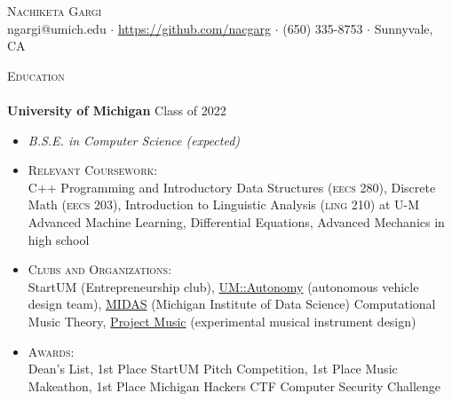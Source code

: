 \documentclass[11pt]{extarticle}
\newcommand{\lineunder} {
	\vspace*{-8pt} \\
	\hspace*{-18pt} \hrulefill \\
}
\newcommand{\header} [1] {
	{\hspace*{-18pt}\vspace*{6pt} \textsc{#1}}
	\vspace*{-6pt} \lineunder
}
\begin{document}
\vspace*{-30pt}
	

\begin{center}
	{\Huge \scshape {Nachiketa Gargi}}\\
	ngargi@umich.edu $\cdot$ \url{https://github.com/nacgarg} $\cdot$ (650) 335-8753 $\cdot$ Sunnyvale, CA \\
\end{center}
\noindent
\header{Education}
\noindent
\textbf{University of Michigan} \hfill Class of 2022
\vspace{-2mm}
\begin{itemize}
	\setlength{\itemindent}{-3mm}
	\item[] \textit{B.S.E. in Computer Science (expected)}\vspace{-3mm}
	\newline
	\vspace{-1mm}

	\item[] \textsc{Relevant Coursework}: \\ C++ Programming and Introductory Data Structures (\textsc{eecs 280}), Discrete Math (\textsc{eecs 203}), Introduction to Linguistic Analysis (\textsc{ling 210}) at U-M \\ Advanced Machine Learning, Differential Equations, Advanced Mechanics in high school
	\item[] \textsc{Clubs and Organizations}:\\ StartUM (Entrepreneurship club), \href{https://umautonomy.com/}{UM::Autonomy} (autonomous vehicle design team), \href{http://www.midasmusictheory.org/}{MIDAS} (Michigan Institute of Data Science) Computational Music Theory, \href{https://michiganprojectmusic.github.io/index.html}{Project Music} (experimental musical instrument design) 
	\item[] \textsc{Awards}:\\ Dean's List, 1st Place StartUM Pitch Competition, 1st Place Music Makeathon, 1st Place Michigan Hackers CTF Computer Security Challenge
\end{itemize}
\end{document}
